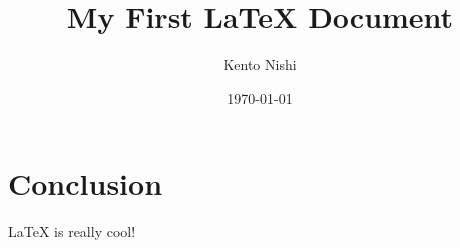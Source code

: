 \documentclass{article}
\title{My First \LaTeX{} Document}
\author{Kento Nishi}
\date{\today}
\begin{document}
\maketitle
\section*{Conclusion}
\LaTeX{} is really cool!
\end{document}
